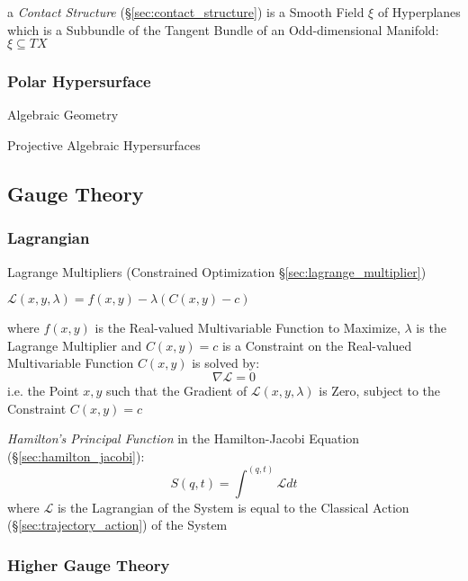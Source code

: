 a \emph{Contact Structure} (\S\ref{sec:contact_structure}) is a Smooth Field
$\xi$ of Hyperplanes which is a Subbundle of the Tangent Bundle of an
Odd-dimensional Manifold: $\xi \subseteq T X$




\subsubsection{Polar Hypersurface}\label{sec:polar_hypersurface}

Algebraic Geometry

Projective Algebraic Hypersurfaces




\subsection{Gauge Theory}\label{sec:gauge_theory}


\subsubsection{Lagrangian}\label{sec:lagrangian}

\fist Lagrange Multipliers (Constrained Optimization
\S\ref{sec:lagrange_multiplier})

$\mathcal{L}(x,y,\lambda) = f(x,y) - \lambda (C(x,y) - c)$

where $f(x,y)$ is the Real-valued Multivariable Function to Maximize, $\lambda$
is the Lagrange Multiplier and $C(x,y) = c$ is a Constraint on the Real-valued
Multivariable Function $C(x,y)$ is solved by:
\[
  \nabla\mathcal{L} = 0
\]
i.e. the Point $x,y$ such that the Gradient of $\mathcal{L}(x,y,\lambda)$ is
Zero, subject to the Constraint $C(x,y) = c$

\emph{Hamilton's Principal Function} in the Hamilton-Jacobi Equation
(\S\ref{sec:hamilton_jacobi}):
\[
  S(q,t) = \int^{(q,t)} \mathcal{L} dt
\]
where $\mathcal{L}$ is the Lagrangian of the System is equal to the Classical
Action (\S\ref{sec:trajectory_action}) of the System



\subsubsection{Higher Gauge Theory}\label{sec:higher_gauge_theory}


